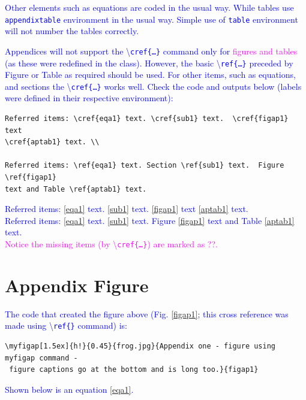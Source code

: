 \documentclass[phd]{ndsu-thesis-2022}
\newcommand\italk[1]{\textcolor{blue}{#1}}  %
\newcommand\cmd[1]{\textbackslash\texttt{#1}}  %
\begin{document}
\italk{Other elements such as equations are coded in the usual way. While tables use \texttt{appendixtable} environment in the usual way. Simple use of \texttt{table} environment will not number the tables correctly.}

\italk{Appendices will not support the \cmd{cref\{\ldots\}} command only for \textcolor{magenta}{figures and tables} (as these were redefined in the class). However, the basic \cmd{ref\{\ldots\}} preceded by Figure or Table as required should be used. For other items, such as equations, and sections the \cmd{cref\{\ldots\}} works well. Check the code and outputs below (labels were defined in their respective environment):}

{\singlespacing
\begin{verbatim}
Referred items: \cref{eqa1} text. \cref{sub1} text.  \cref{figap1} text 
\cref{aptab1} text. \\

Referred items: \ref{eqa1} text. Section \ref{sub1} text.  Figure \ref{figap1} 
text and Table \ref{aptab1} text.
\end{verbatim}
}

\italk{Referred items: \cref{eqa1} text. \cref{sub1} text.  \cref{figap1} text \cref{aptab1} text. \\
Referred items: \ref{eqa1} text. \ref{sub1} text.  Figure \ref{figap1} text and Table \ref{aptab1} text.
\\ \textcolor{magenta}{Notice the missing items (by \cmd{cref\{\ldots\}}) are marked as ??.}}

\section{Appendix Figure}


\italk{The code that created the figure above (Fig. \ref{figap1}; this cross reference was made using \cmd{ref\{\}} command) is:}

{\onehalfspacing
\begin{verbatim}
\myfigap[1.5ex]{h!}{0.45}{frog.jpg}{Appendix one - figure using myfigap command -
 figure captions go at the bottom and is long too.}{figap1}
\end{verbatim}
}

\italk{Shown below is an equation \cref{eqa1}. } 
\end{document}
